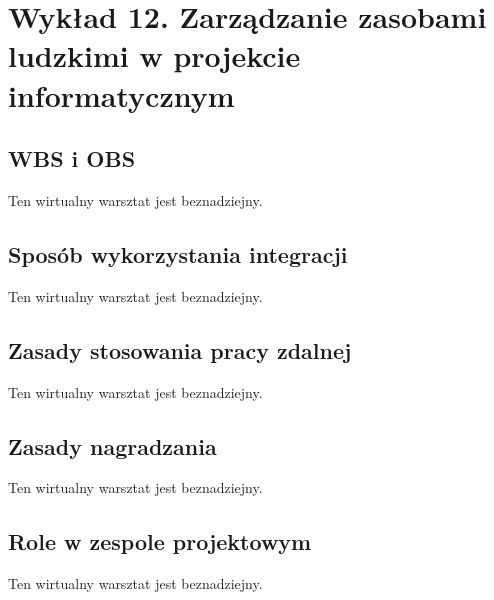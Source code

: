 \chapter{Wykład 12. Zarządzanie zasobami ludzkimi w projekcie informatycznym}

\section{WBS i OBS}

Ten wirtualny warsztat jest beznadziejny.


\section{Sposób wykorzystania integracji}

Ten wirtualny warsztat jest beznadziejny.


\section{Zasady stosowania pracy zdalnej}

Ten wirtualny warsztat jest beznadziejny.


\section{Zasady nagradzania}

Ten wirtualny warsztat jest beznadziejny.


\section{Role w zespole projektowym}

Ten wirtualny warsztat jest beznadziejny.



